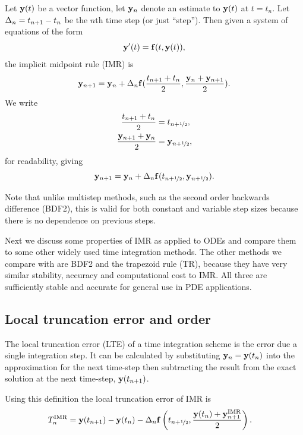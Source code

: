 Let $\mathbf{y}(t)$ be a vector function, let $\mathbf{y}_n$ denote an estimate to $\mathbf{y}(t)$ at $t = t_n$.
Let $\Delta_{n} = t_{n+1} - t_n$ be the $n$th time step (or just ``step'').
Then given a system of equations of the form
\begin{equation}
  \mathbf{y}'(t) = {\mathbf{f}}(t, \mathbf{y}(t)),
  \label{eq:43}
\end{equation}
the implicit midpoint rule (IMR) is
\begin{equation}
    \mathbf{y}_{n+1} = \mathbf{y}_n + \Delta_{n} {\mathbf{f}}(\frac{t_{n+1} + t_n}{2}, \frac{\mathbf{y}_n + \mathbf{y}_{n+1}}{2}).
    \notag
\end{equation}
We write
\begin{equation}
  \begin{aligned}
    \frac{t_{n+1} + t_n}{2} &= t_{n+\nicefrac{1}{2}}, \\
    \frac{\mathbf{y}_{n+1} + \mathbf{y}_n}{2} &= \mathbf{y}_{n+\nicefrac{1}{2}},
  \end{aligned}
\end{equation}
for readability, giving
\begin{equation}
  \mathbf{y}_{n+1} = \mathbf{y}_n + \Delta_{n} {\mathbf{f}}(t_{n+\nicefrac{1}{2}}, \mathbf{y}_{n+\nicefrac{1}{2}}).
  \label{eq:basic-midpoint}
\end{equation}

Note that unlike multistep methods, such as the second order backwards difference (BDF2), this is valid for both constant and variable step sizes because there is no dependence on previous steps.

Next we discuss some properties of IMR as applied to ODEs and compare them to some other widely used time integration methods.
The other methods we compare with are BDF2 and the trapezoid rule (TR), because they have very similar stability, accuracy and computational cost to IMR.
All three are sufficiently stable and accurate for general use in PDE applications.

\subsection{Local truncation error and order}
\label{sec:deriv-local-trunc}

The local truncation error (LTE) of a time integration scheme is the error due a single integration step.
It can be calculated by substituting $\mathbf{y}_n = \mathbf{y}(t_n)$ into the approximation for the next time-step then subtracting the result from the exact solution at the next time-step, $\mathbf{y}(t_{n+1})$.

Using this definition the local truncation error of IMR is
\begin{align}
  T_n^{\text{IMR}} &=  \mathbf{y}(t_{n+1}) - \mathbf{y}(t_n) - \Delta_{n} {\mathbf{f}}\left( t_{n+\nicefrac{1}{2}}, \frac{\mathbf{y}(t_n) + \mathbf{y}_{n+1}^{\text{IMR}}}{2} \right).
              \label{eq:trunc-start}
\end{align}

